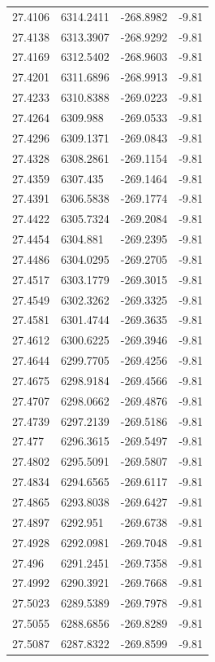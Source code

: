 \begin{table}[H]
\begin{tabular}{llll}
27.4106 & 6314.2411 & -268.8982 & -9.81 \\
27.4138 & 6313.3907 & -268.9292 & -9.81 \\
27.4169 & 6312.5402 & -268.9603 & -9.81 \\
27.4201 & 6311.6896 & -268.9913 & -9.81 \\
27.4233 & 6310.8388 & -269.0223 & -9.81 \\
27.4264 & 6309.988 & -269.0533 & -9.81 \\
27.4296 & 6309.1371 & -269.0843 & -9.81 \\
27.4328 & 6308.2861 & -269.1154 & -9.81 \\
27.4359 & 6307.435 & -269.1464 & -9.81 \\
27.4391 & 6306.5838 & -269.1774 & -9.81 \\
27.4422 & 6305.7324 & -269.2084 & -9.81 \\
27.4454 & 6304.881 & -269.2395 & -9.81 \\
27.4486 & 6304.0295 & -269.2705 & -9.81 \\
27.4517 & 6303.1779 & -269.3015 & -9.81 \\
27.4549 & 6302.3262 & -269.3325 & -9.81 \\
27.4581 & 6301.4744 & -269.3635 & -9.81 \\
27.4612 & 6300.6225 & -269.3946 & -9.81 \\
27.4644 & 6299.7705 & -269.4256 & -9.81 \\
27.4675 & 6298.9184 & -269.4566 & -9.81 \\
27.4707 & 6298.0662 & -269.4876 & -9.81 \\
27.4739 & 6297.2139 & -269.5186 & -9.81 \\
27.477 & 6296.3615 & -269.5497 & -9.81 \\
27.4802 & 6295.5091 & -269.5807 & -9.81 \\
27.4834 & 6294.6565 & -269.6117 & -9.81 \\
27.4865 & 6293.8038 & -269.6427 & -9.81 \\
27.4897 & 6292.951 & -269.6738 & -9.81 \\
27.4928 & 6292.0981 & -269.7048 & -9.81 \\
27.496 & 6291.2451 & -269.7358 & -9.81 \\
27.4992 & 6290.3921 & -269.7668 & -9.81 \\
27.5023 & 6289.5389 & -269.7978 & -9.81 \\
27.5055 & 6288.6856 & -269.8289 & -9.81 \\
27.5087 & 6287.8322 & -269.8599 & -9.81 \\

\end{tabular}
\end{table}
